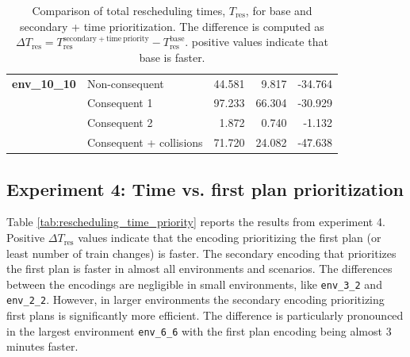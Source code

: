 \documentclass[runningheads]{llncs}
\begin{document}
\begin{table}[htbp]
\begin{tabular}{@{}llrrr@{}}
		\midrule

		\textbf{env\_10\_10}
		& Non-consequent & 44.581 & 9.817 & -34.764 \\
		& Consequent 1 & 97.233 & 66.304 & -30.929 \\
		& Consequent 2 & 1.872 & 0.740 & -1.132 \\
		& Consequent + collisions & 71.720 & 24.082 & -47.638 \\
		
		\bottomrule
	\end{tabular}
	\vspace{4mm}
	\caption{Comparison of total rescheduling times, $T_{\mathrm{res}}$, for
		base and secondary + time prioritization. The difference is
		computed as
		$\Delta T_{\mathrm{res}} =
		T_{\mathrm{res}}^{\mathrm{secondary+time\ priority}} -
		T_{\mathrm{res}}^{\mathrm{base}}$.
		positive values indicate that base is faster.}
	\label{tab:rescheduling_time_prioritization}
\end{table}

\subsection{Experiment 4: Time vs. first plan prioritization}

Table \ref{tab:rescheduling_time_priority} reports the results from experiment 4. Positive $\Delta T_{\mathrm{res}}$ values indicate that the encoding prioritizing the first plan (or least number of train changes) is faster. The secondary encoding that prioritizes the first plan is faster in almost all environments and scenarios. The differences between the encodings are negligible in small environments, like \texttt{env\_3\_2} and \texttt{env\_2\_2}. However, in larger environments the secondary encoding prioritizing first plans is significantly more efficient. The difference is particularly pronounced in the largest environment \texttt{env\_6\_6} with the first plan encoding being almost 3 minutes faster.
\end{document}
